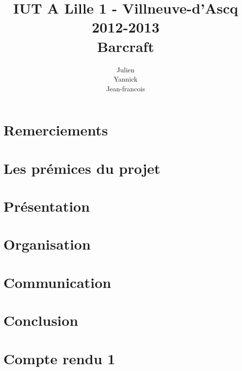 \documentclass[11pt,a4paper]{report}
\title
{
	\normalsize{IUT A Lille 1 - Villneuve-d'Ascq\\
	2012-2013}\\
	\vspace{15mm}
  \Huge{Barcraft
    \vspace{15mm}}
}
\author{
\bsc{Stechele} Julien\\
\bsc{Vanuxem} Yannick\\
\bsc{Serir} Jean-francois\\
	\vspace{30mm}
}
\begin{document}

\maketitle
\tableofcontents
\newpage

\chapter{Remerciements}%
\label{cha:remerciements}



\chapter{Les prémices du projet}%
\label{cha:les_pr_mices_du_projet}



\chapter{Présentation}%
\label{cha:presentation}



\chapter{Organisation}%
\label{cha:organisation}



\chapter{Communication}%
\label{cha:communication}



\chapter{Conclusion}%
\label{cha:conclusion}




\appendix

\chapter{Compte rendu 1}%
\label{cha:compte_rendu_1}
\end{document}
